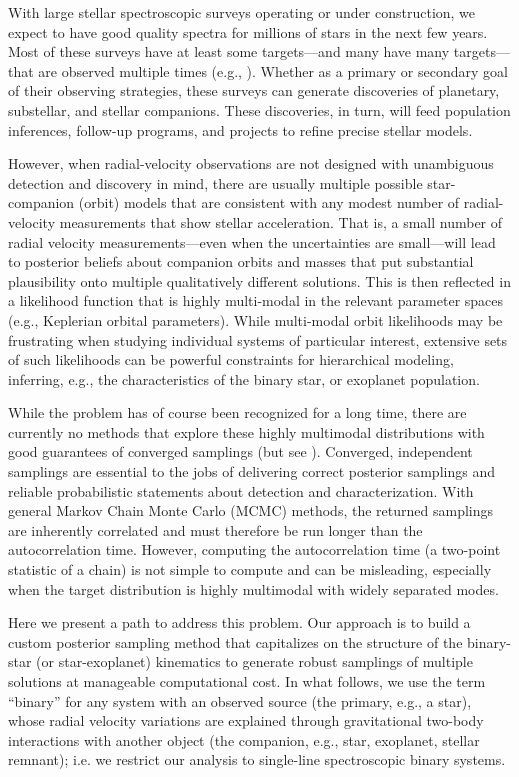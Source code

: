 \documentclass[manuscript, letterpaper]{aastex6}
\newcommand{\resp}[1]{#1}
\begin{document}
With large stellar spectroscopic surveys operating or under
construction, we expect to have good quality spectra for millions
of stars in the next few years.
Most of these surveys have at least some targets---and many have many
targets---that are observed multiple times (e.g., \citealt{Majewski:2015}).
Whether as a primary or secondary goal of their observing
strategies, these surveys can generate discoveries of planetary,
substellar, and stellar companions.
These discoveries, in turn, will feed population inferences, follow-up
programs, and projects to refine precise stellar models.

However, when radial-velocity observations are not designed with
unambiguous detection and discovery in mind, there are usually
multiple possible star-companion (orbit) models that are consistent with any
modest number of radial-velocity measurements that show stellar
acceleration.
That is, a small number of radial velocity measurements---even when the
uncertainties are small---will lead to posterior beliefs about companion
orbits and masses that put substantial plausibility onto multiple
qualitatively different solutions.
This is then reflected in a likelihood function that is highly multi-modal in
the relevant parameter spaces (e.g., Keplerian orbital parameters).
While multi-modal orbit likelihoods may be frustrating when studying individual
systems of particular interest, extensive sets of such likelihoods can
be powerful constraints for hierarchical modeling, inferring, e.g., the
characteristics of the binary star, or exoplanet population.

While the problem has of course been recognized for a long time, there are
currently no methods that explore these highly multimodal
\resp{distributions} with good guarantees of \resp{converged samplings} (but see
\citealt{Gregory:2005,Brewer:2015}).
\resp{Converged, independent samplings are essential to the jobs of delivering
correct posterior samplings and reliable probabilistic statements about
detection and characterization.
With general Markov Chain Monte Carlo (MCMC) methods, the returned samplings are
inherently correlated and must therefore be run longer than the autocorrelation
time.
However, computing the autocorrelation time (a two-point statistic of a chain)
is not simple to compute and can be misleading, especially when the target
distribution is highly multimodal with widely separated modes.}

Here we present a path to address this problem.
Our approach is to build a custom posterior sampling method that capitalizes on
the structure of the binary-star (or star-exoplanet) kinematics to generate
robust samplings of multiple solutions at manageable computational cost.
In what follows, we use the term ``binary'' for any system with an observed
source (the primary, e.g., a star), whose radial velocity variations are
explained through gravitational two-body interactions with another object (the
companion, e.g., star, exoplanet, stellar remnant); i.e. we restrict our
analysis to single-line spectroscopic binary systems.
\end{document}
